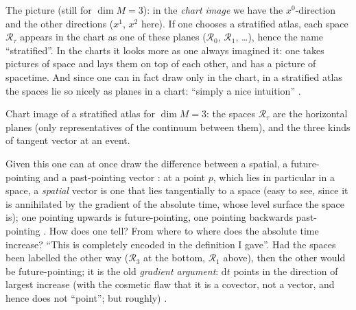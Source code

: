 \begin{paracol}{2}
The picture (still for $\dim M=3$): in the \emph{chart image} we have the $x^0$-direction and the other directions ($x^1$, $x^2$ here). If one chooses a stratified atlas, each space $\mathcal R_\tau$ appears in the chart as one of these planes
($\mathcal R_0$, $\mathcal R_1$, \dots), hence the name ``stratified''. In the charts it looks more as one always imagined it: one takes pictures of space and lays them on top of each other, and has a picture of spacetime. And since one
can in fact draw only in the chart, in a stratified atlas the spaces lie so nicely as planes in a chart: ``simply a nice intuition'' .

\begin{nfigure}
\caption*{Chart image of a stratified atlas for $\dim M=3$: the spaces $\mathcal R_\tau$ are the horizontal planes
(only representatives of the continuum between them), and the three kinds of tangent vector at an event.}
\end{nfigure}
Given this one can at once draw the difference between a spatial, a future-pointing and a past-pointing vector : at a point $p$, which lies in particular in a space, a \emph{spatial} vector is one that lies
tangentially to a space (easy to see, since it is annihilated by the gradient of the absolute time, whose level surface the space is); one pointing upwards is future-pointing, one pointing backwards
past-pointing . How does one tell? From where to where does the absolute time increase? ``This is completely encoded in the definition I gave''. Had the
spaces been labelled the other way ($\mathcal R_3$ at the bottom, $\mathcal R_1$ above), then the other would be future-pointing; it is the old \emph{gradient argument}: $\mathrm dt$ points in the direction of largest increase
(with the cosmetic flaw that it is a covector, not a vector, and hence does not ``point''; but roughly) .


\end{paracol}
